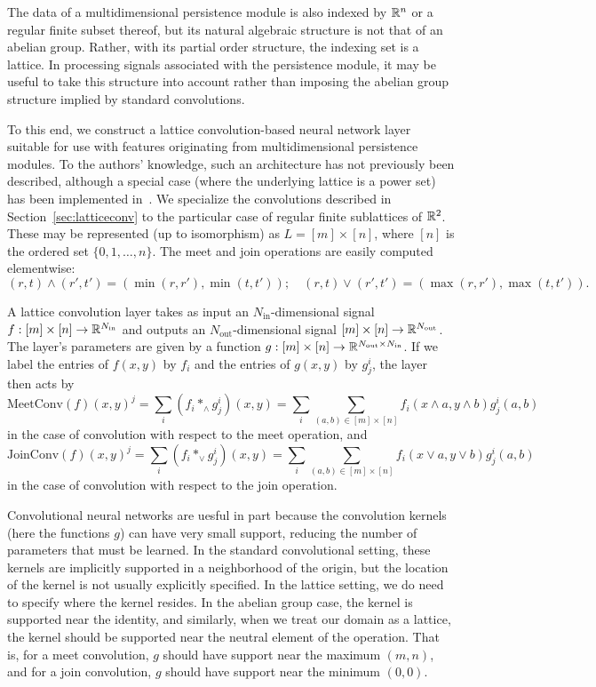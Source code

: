 \documentclass{article}
\begin{document}
The data of a multidimensional persistence module is also indexed by $\mathbb{R}^n$ or a
regular finite subset thereof, but its natural algebraic structure is not that
of an abelian group. Rather, with its partial order structure, the indexing set
is a lattice. In processing signals associated with the persistence module, it
may be useful to take this structure into account rather than imposing the
abelian group structure implied by standard convolutions.

To this end, we construct a lattice convolution-based neural network layer
suitable for use with features originating from multidimensional persistence
modules. To the authors' knowledge, such an architecture has not previously been
described, although a special case (where the underlying lattice is a power set)
has been implemented in~\cite{wendler_powerset_2019}. We specialize the convolutions described in
Section~\ref{sec:latticeconv} to the particular case of regular finite
sublattices of $\mathbb{R}^2$. These may be represented (up to isomorphism) as $L = [m]
\times [n]$, where $[n]$ is the ordered set $\{0,1,\dots,n\}$. The meet and join operations are easily computed
elementwise:
\[(r,t) \wedge (r',t') = (\min(r,r'),\min(t,t'));\quad (r,t)\vee (r',t') =
  (\max(r,r'),\max(t,t')).\]

A lattice convolution layer takes as input an $N_{\text{in}}$-dimensional signal
$f : [m] \times [n] \to \mathbb{R}^{N_{\text{in}}}$ and outputs an
$N_{\text{out}}$-dimensional signal $ [m] \times [n] \to
\mathbb{R}^{N_{\text{out}}}$. The layer's parameters are given by a function $g: [m]
\times [n] \to \mathbb{R}^{N_{\text{out}}\times N_{\text{in}}}$. If we label the
entries of $f(x,y)$ by $f_i$ and the entries of $g(x,y)$ by $g^i_j$, the layer then acts by
\[\text{MeetConv}(f)(x,y)^j = \sum_{i} (f_i \ast_{\wedge} g^i_j)(x,y) = \sum_i
  \sum_{(a,b) \in [m]\times [n]} f_i(x \wedge a, y \wedge b)g^i_j(a,b)\]
in the case of convolution with respect to the meet operation, and
\[\text{JoinConv}(f)(x,y)^j = \sum_{i} (f_i \ast_{\vee} g^i_j)(x,y) = \sum_i
  \sum_{(a,b) \in [m]\times [n]} f_i(x \vee a, y \vee b)g^i_j(a,b)\]
in the case of convolution with respect to the join operation.

Convolutional neural networks are uesful in part because the convolution kernels
(here the functions $g$) can have very small support, reducing the number of
parameters that must be learned. In the standard convolutional setting, these
kernels are implicitly supported in a neighborhood of the origin, but the
location of the kernel is not usually explicitly specified. In the lattice
setting, we do need to specify where the kernel resides. In the abelian group
case, the kernel is supported near the identity, and similarly, 
when we treat our domain as a lattice, the kernel should be supported
near the neutral element of the operation. That is, for a meet convolution, $g$
should have support near the maximum $(m,n)$, and for a join convolution, $g$
should have support near the minimum $(0,0)$.
\end{document}
